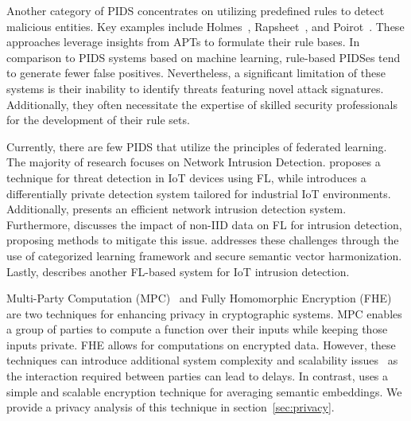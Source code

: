  Another category of PIDS concentrates on utilizing predefined rules to detect malicious entities. Key examples include Holmes~\cite{holmes2019}, Rapsheet~\cite{rapsheet2020}, and Poirot~\cite{poirot2019}. These approaches leverage insights from APTs to formulate their rule bases. In comparison to PIDS systems based on machine learning, rule-based PIDSes tend to generate fewer false positives. Nevertheless, a significant limitation of these systems is their inability to identify threats featuring novel attack signatures. Additionally, they often necessitate the expertise of skilled security professionals for the development of their rule sets.

Currently, there are few PIDS that utilize the principles of federated learning. The majority of research focuses on Network Intrusion Detection. \cite{man2021intelligent} proposes a technique for threat detection in IoT devices using FL, while \cite{friha20232df} introduces a differentially private detection system tailored for industrial IoT environments. Additionally, \cite{li2023efficient} presents an efficient network intrusion detection system. Furthermore, \cite{guo2023new} discusses the impact of non-IID data on FL for intrusion detection, proposing methods to mitigate this issue.  \Sys addresses these challenges through the use of categorized \gnnshort learning framework and secure semantic vector harmonization. Lastly, \cite{chaabene2023privacy} describes another FL-based system for IoT intrusion detection.

Multi-Party Computation (MPC)~\cite{cramer2015secure} and Fully Homomorphic Encryption (FHE)~\cite{armknecht2015guide} are two techniques for enhancing privacy in cryptographic systems. MPC enables a group of parties to compute a function over their inputs while keeping those inputs private. FHE allows for computations on encrypted data. However, these techniques can introduce additional system complexity and scalability issues~\cite{du2001secure,gentry2009fully,asharov2013more} as the interaction required between parties can lead to delays. In contrast, \Sys uses a simple and scalable encryption technique for averaging semantic embeddings. We provide a privacy analysis of this technique in section~\ref{sec:privacy}.

